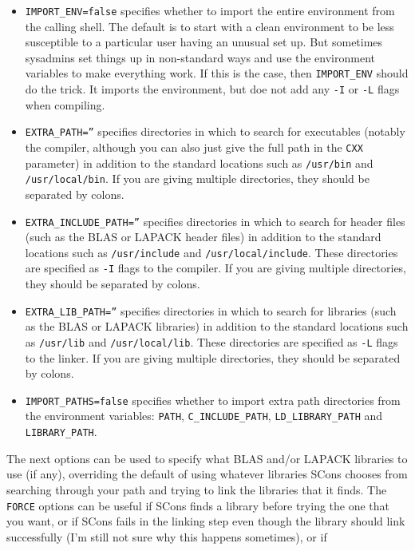 \documentclass[twoside,letterpaper,11pt]{article}
\begin{document}
\begin{enumerate}
\begin{itemize}
\item \texttt{IMPORT\_ENV=false} specifies whether to import the entire environment from the calling shell.
The default
is to start with a clean environment to be less susceptible to a particular user having an unusual set up.  But sometimes sysadmins set things up in non-standard ways and use
the environment variables to make everything work.  If this is the case, then 
\texttt{IMPORT\_ENV} should do the trick.  It imports the environment, but doe not add any
\texttt{-I} or \texttt{-L} flags when compiling.
\item \texttt{EXTRA\_PATH=''} specifies directories in which to search for executables (notably the compiler, although you can also just give the full path in the \texttt{CXX} parameter)
in addition to the standard locations such as \texttt{/usr/bin} and \texttt{/usr/local/bin}.
If you are giving multiple directories, they should be separated by colons.
\item \texttt{EXTRA\_INCLUDE\_PATH=''} specifies directories in which to search for header files
(such as the BLAS or LAPACK header files)
in addition to the standard locations such as \texttt{/usr/include} and \texttt{/usr/local/include}.
These directories are specified as \texttt{-I} flags to the compiler.
If you are giving multiple directories, they should be separated by colons.
\item \texttt{EXTRA\_LIB\_PATH=''} specifies directories in which to search for libraries
(such as the BLAS or LAPACK libraries)
in addition to the standard locations such as \texttt{/usr/lib} and \texttt{/usr/local/lib}.  
These directories are specified as \texttt{-L} flags to the linker.
If you are giving multiple directories, they should be separated by colons.
\item \texttt{IMPORT\_PATHS=false} specifies whether to import extra path directories from the environment variables: 
\texttt{PATH}, \texttt{C\_INCLUDE\_PATH}, \texttt{LD\_LIBRARY\_PATH} and \texttt{LIBRARY\_PATH}.
\end{itemize}
The next options can be used to specify what BLAS and/or LAPACK libraries to use (if any),
overriding the default of using whatever libraries SCons chooses from searching through your path
and trying to link the libraries that it finds.  The \texttt{FORCE} options can be useful if SCons finds
a library before trying the one that you want, or if SCons fails in the linking step even though
the library should link successfully (I'm still not sure why this happens sometimes), or if

\end{enumerate}
\end{document}
